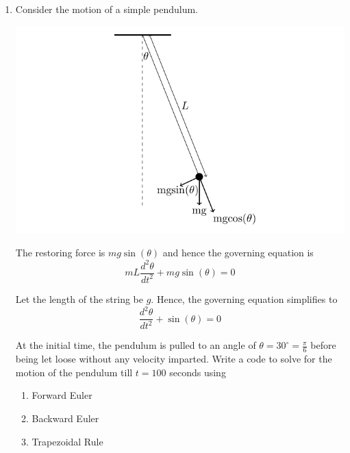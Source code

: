 \documentclass[a4paper,11pt]{report}
\begin{document}
\begin{enumerate}
    \pagebreak

    \item Consider the motion of a simple pendulum. 

    \begin{center}
    \includegraphics{pendulum.pdf}
    \end{center}

    The restoring force is $mg \sin(\theta)$ and hence the governing equation 
    is
    \begin{equation*}
    mL \frac{d^{2} \theta}{dt^{2}} + mg \sin(\theta) = 0
    \end{equation*}

    Let the length of the string be $g$. Hence, the governing equation 
    simplifies to
    \begin{equation*}
    \frac{d^{2} \theta}{dt^{2}} + \sin(\theta) = 0
    \end{equation*}

    At the initial time, the pendulum is pulled to an angle of $\theta = 
    30^{\circ} = \displaystyle \frac{\pi}{6}$ before being let loose without 
    any velocity imparted. Write a code to solve for the motion of the 
    pendulum till $t = 100$ seconds using

    \begin{enumerate}
    \item Forward Euler
    \item Backward Euler
    \item Trapezoidal Rule
    \end{enumerate}


\end{enumerate}
\end{document}
